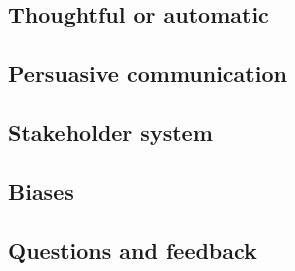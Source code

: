 \documentclass[../summary.tex]{subfiles}
\begin{document}
		\subsection{Thoughtful or automatic}
		
		\subsection{Persuasive communication}
		
		\subsection{Stakeholder system}
		
		\subsection{Biases}
		
		\subsection{Questions and feedback}
\end{document}
